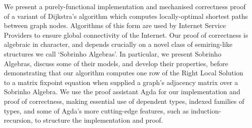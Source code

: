 We present a purely-functional implementation and mechanised correctness proof of a variant of Dijkstra's algorithm which computes locally-optimal shortest paths between graph nodes.
Algorithms of this form are used by Internet Service Providers to ensure global connectivity of the Internet.
Our proof of correctness is algebraic in character, and depends crucially on a novel class of semiring-like structures we call `Sobrinho Algebras'.
In particular, we present Sobrinho Algebras, discuss some of their models, and develop their properties, before demonstrating that our algorithm computes one row of the Right Local Solution to a matrix fixpoint equation when supplied a graph's adjacency matrix over a Sobrinho Algebra.
We use the proof assistant Agda for our implementation and proof of correctness, making essential use of dependent types, indexed families of types, and some of Agda's more cutting-edge features, such as induction-recursion, to structure the implementation and proof.

